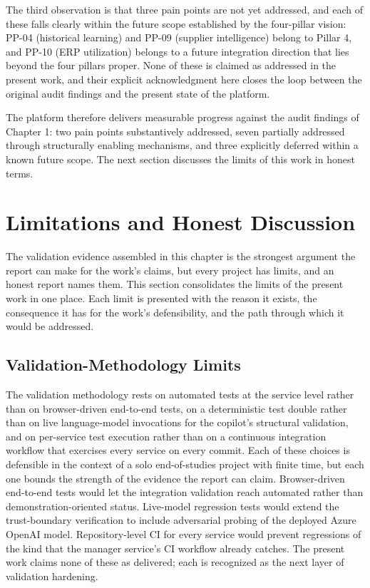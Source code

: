 The third observation is that three pain points are not yet addressed, and each of these falls clearly within the future scope established by the four-pillar vision: PP-04 (historical learning) and PP-09 (supplier intelligence) belong to Pillar 4, and PP-10 (ERP utilization) belongs to a future integration direction that lies beyond the four pillars proper. None of these is claimed as addressed in the present work, and their explicit acknowledgment here closes the loop between the original audit findings and the present state of the platform.

The platform therefore delivers measurable progress against the audit findings of Chapter 1: two pain points substantively addressed, seven partially addressed through structurally enabling mechanisms, and three explicitly deferred within a known future scope. The next section discusses the limits of this work in honest terms.

\section{Limitations and Honest Discussion}
The validation evidence assembled in this chapter is the strongest argument the report can make for the work's claims, but every project has limits, and an honest report names them. This section consolidates the limits of the present work in one place. Each limit is presented with the reason it exists, the consequence it has for the work's defensibility, and the path through which it would be addressed.

\subsection*{Validation-Methodology Limits}
The validation methodology rests on automated tests at the service level rather than on browser-driven end-to-end tests, on a deterministic test double rather than on live language-model invocations for the copilot's structural validation, and on per-service test execution rather than on a continuous integration workflow that exercises every service on every commit. Each of these choices is defensible in the context of a solo end-of-studies project with finite time, but each one bounds the strength of the evidence the report can claim. Browser-driven end-to-end tests would let the integration validation reach automated rather than demonstration-oriented status. Live-model regression tests would extend the trust-boundary verification to include adversarial probing of the deployed Azure OpenAI model. Repository-level CI for every service would prevent regressions of the kind that the manager service's CI workflow already catches. The present work claims none of these as delivered; each is recognized as the next layer of validation hardening.

